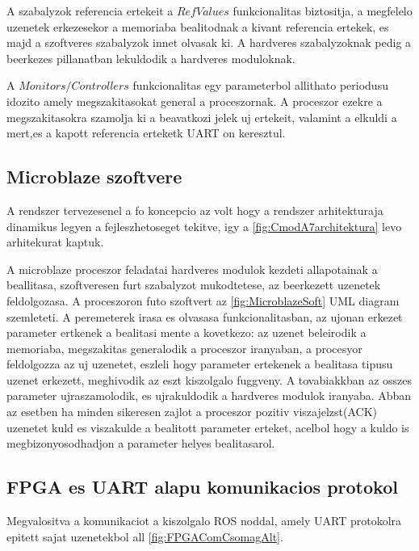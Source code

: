 A szabalyzok referencia ertekeit a $RefValues$ funkcionalitas biztositja, a megfelelo uzenetek erkezesekor a memoriaba bealitodnak a kivant referencia ertekek, es majd a szoftveres szabalyzok innet olvasak ki. A hardveres szabalyzoknak pedig a beerkezes pillanatban lekuldodik a hardveres moduloknak.

A $Monitors/Controllers$ funkcionalitas egy parameterbol allithato periodusu idozito amely megszakitasokat general a proceszornak. A proceszor ezekre a megszakitasokra szamolja ki a beavatkozi jelek uj ertekeit, valamint a elkuldi a mert,es a kapott referencia erteketk UART on keresztul.



\subsection{Microblaze szoftvere}

A rendszer tervezesenel a fo koncepcio az volt hogy a rendszer arhitekturaja dinamikus legyen a fejleszhetoseget tekitve, igy a \ref{fig:CmodA7architektura} levo arhitekurat kaptuk.

A microblaze proceszor feladatai hardveres modulok kezdeti allapotainak a beallitasa, szoftveresen furt szabalyzot mukodtetese, az beerkezett uzenetek feldolgozasa. A proceszoron futo szoftvert az \ref{fig:MicroblazeSoft} UML diagram szemleteti.
A peremeterek irasa es olvasasa funkcionalitasban, az ujonan erkezet parameter ertkenek a bealitasi mente a kovetkezo: az uzenet beleirodik a memoriaba, megszakitas generalodik a proceszor iranyaban, a procesyor feldolgozza az uj uzenetet, eszleli hogy parameter ertekenek a bealitasa tipusu uzenet erkezett, meghivodik az eszt kiszolgalo fuggveny. A tovabiakkban az osszes parameter ujraszamolodik, es ujrakuldodik a hardveres modulok iranyaba. Abban az esetben ha minden sikeresen zajlot a proceszor pozitiv viszajelzst(ACK) uzenetet kuld es viszakulde a bealitott parameter erteket, acelbol hogy a kuldo is megbizonyosodhadjon a parameter helyes bealitasarol.


\renewcommand{\img}{SajatRobot/FPGAmodulok/uBlazeAndFpgaUML.jpg}
\renewcommand{\sources}{*}
\renewcommand{\captionn}{MicroBlaze proceszoron futo szoftver diagramja}
\renewcommand{\figlabel}{MicroblazeSoft}





\subsection{FPGA es UART alapu komunikacios protokol}
\label{fig:FPGAcomuSection}
Megvalositva a komunikaciot a kiszolgalo ROS noddal, amely UART protokolra epitett sajat uzenetekbol all \ref{fig:FPGAComCsomagAlt}.


